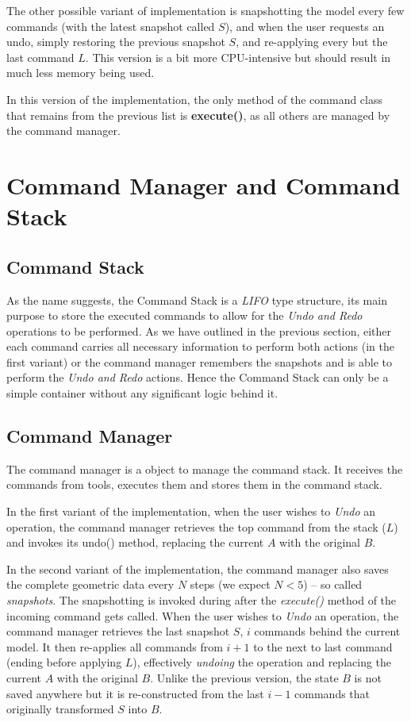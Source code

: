 The other possible variant of implementation is snapshotting the model every few commands (with the latest snapshot called $S$), and when the user requests an undo, simply restoring the previous snapshot $S$, and re-applying every but the last command $L$. This version is a bit more CPU-intensive but should result in much less memory being used.

In this version of the implementation, the only method of the command class that remains from the previous list is \textbf{execute()}, as all others are managed by the command manager.

\section{Command Manager and Command Stack}

\subsection{Command Stack}

As the name suggests, the Command Stack is a \textit{LIFO} type structure, its main purpose to store the executed commands to allow for the \textit{Undo and Redo} operations to be performed. As we have outlined in the previous section, either each command carries all necessary information to perform both actions (in the first variant) or the command manager remembers the snapshots and is able to perform the \textit{Undo and Redo} actions. Hence the Command Stack can only be a simple container without any significant logic behind it.

\subsection{Command Manager}

The command manager is a object to manage the command stack. It receives the commands from tools, executes them and stores them in the command stack.

In the first variant of the implementation, when the user wishes to \textit{Undo} an operation, the command manager retrieves the top command from the stack ($L$) and invokes its undo() method, replacing the current $A$ with the original $B$.

In the second variant of the implementation, the command manager also saves the complete geometric data every $N$ steps (we expect $N < 5$) -- so called \textit{snapshots}. The snapshotting is invoked during after the \textit{execute()} method of the incoming command gets called. When the user wishes to \textit{Undo} an operation, the command manager retrieves the last snapshot $S$, $i$ commands behind the current model. It then re-applies all commands from $i+1$ to the next to last command (ending before applying $L$), effectively \textit{undoing} the operation and replacing the current $A$ with the original $B$. Unlike the previous version, the state $B$ is not saved anywhere but it is re-constructed from the last $i-1$ commands that originally transformed $S$ into $B$.

